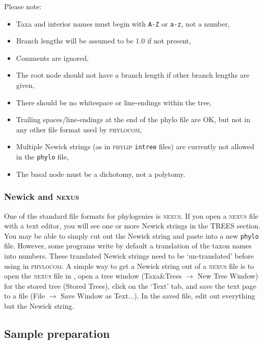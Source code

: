 \documentclass[12pt,letterpaper]{article}
\begin{document}
Please note: 

\begin{itemize}
  \item Taxa and interior names must begin with \verb|A-Z| or
    \verb|a-z|, not a number,
  \item Branch lengths will be assumed to be 1.0 if not present,
  \item Comments are ignored,
  \item The root node should not have a branch length if other branch
    lengths are given,
  \item There should be no whitespace or line-endings within the tree,
  \item Trailing spaces/line-endings at the end of the phylo file are
    OK, but not in any other file format used by {\scshape phylocom},
  \item Multiple Newick strings (as in {\scshape phylip} \verb|intree|
    files) are currently not allowed in the \verb|phylo| file,
  \item The basal node must be a dichotomy, not a polytomy.
\end{itemize}

\subsubsection{Newick and {\scshape nexus}}

One of the standard file formats for phylogenies is {\scshape nexus}.  If
you open a {\scshape nexus} file with a text editor, you will see one or
more Newick strings in the TREES section.  You may be able to simply
cut out the Newick string and paste into a new \verb|phylo| file.
However, some programs write by default a translation of the taxon
names into numbers.  These translated Newick strings need to be
`un-translated' before using in {\scshape phylocom}.  A simple way to get a
Newick string out of a {\scshape nexus} file is to open the {\scshape nexus}
file in ,
open a tree window (Taxa\&Trees $\to$ New Tree Window) for the stored
tree (Stored Trees), click on the `Text' tab, and save the text page
to a file (File $\to$ Save Window as Text...).  In the saved file,
edit out everything but the Newick string.

\subsection{Sample preparation}
 
\end{document}
